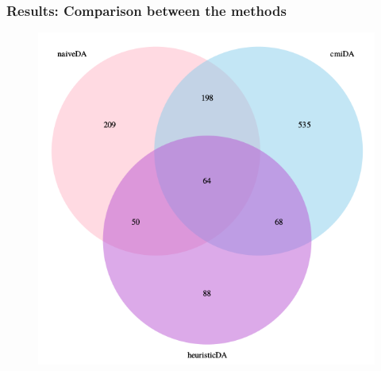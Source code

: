\documentclass[handout]{beamer}
\begin{document}
\begin{frame}
	\frametitle{Results: Comparison between the methods}
\begin{center}
	\begin{figure}[h]          
		\includegraphics[height=0.8\textheight]{images/genesInCommonBetweenMethodsInDA.png}
	\end{figure}
\end{center}
\end{frame}
\end{document}
